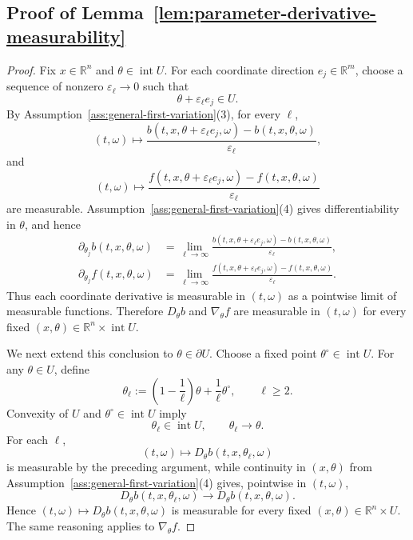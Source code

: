 \documentclass[11pt]{amsart}
\numberwithin{equation}{section} %
\theoremstyle{remark}
\begin{document}
\subsection{Proof of Lemma~\ref{lem:parameter-derivative-measurability}}
\label{app:regularity-parameter-derivatives}

\begin{proof}
Fix $x\in\mathbb R^n$ and
$\theta\in\operatorname{int}U$.
For each coordinate direction $e_j\in\mathbb R^m$, choose a sequence
of nonzero $\varepsilon_\ell\to0$ such that
\[
\theta+\varepsilon_\ell e_j\in U.
\]
By Assumption~\ref{ass:general-first-variation}(3), for every $\ell$,
\[
(t,\omega)
\longmapsto
\frac{b(t,x,\theta+\varepsilon_\ell e_j,\omega)-b(t,x,\theta,\omega)}{\varepsilon_\ell},
\]
and
\[
(t,\omega)
\longmapsto
\frac{f(t,x,\theta+\varepsilon_\ell e_j,\omega)-f(t,x,\theta,\omega)}{\varepsilon_\ell}
\]
are measurable. Assumption~\ref{ass:general-first-variation}(4)
gives differentiability in $\theta$, and hence
\[
\begin{aligned}
\partial_{\theta_j}b(t,x,\theta,\omega)
&=\lim_{\ell\to\infty}
\frac{b(t,x,\theta+\varepsilon_\ell e_j,\omega)-b(t,x,\theta,\omega)}{\varepsilon_\ell},\\
\partial_{\theta_j}f(t,x,\theta,\omega)
&=\lim_{\ell\to\infty}
\frac{f(t,x,\theta+\varepsilon_\ell e_j,\omega)-f(t,x,\theta,\omega)}{\varepsilon_\ell}.
\end{aligned}
\]
Thus each coordinate derivative is measurable in $(t,\omega)$ as a
pointwise limit of measurable functions. Therefore $D_\theta b$ and
$\nabla_\theta f$ are measurable in $(t,\omega)$ for every fixed
$(x,\theta)\in\mathbb R^n\times\operatorname{int}U$.

We next extend this conclusion to $\theta\in\partial U$. Choose a fixed point $\theta^\circ\in\operatorname{int}U$.
For any $\theta\in U$, define
\[
\theta_\ell
:=
\left(1-\frac1\ell\right)\theta
+
\frac1\ell\theta^\circ,
\qquad \ell\ge2.
\]
Convexity of $U$ and
$\theta^\circ\in\operatorname{int}U$ imply
\[
\theta_\ell\in\operatorname{int}U,
\qquad
\theta_\ell\longrightarrow\theta.
\]
For each $\ell$,
\[
(t,\omega)
\longmapsto
D_\theta b(t,x,\theta_\ell,\omega)
\]
is measurable by the preceding argument, while continuity in
$(x,\theta)$ from
Assumption~\ref{ass:general-first-variation}(4) gives, pointwise in
$(t,\omega)$,
\[
D_\theta b(t,x,\theta_\ell,\omega)
\longrightarrow
D_\theta b(t,x,\theta,\omega).
\]
Hence
$(t,\omega)\mapsto D_\theta b(t,x,\theta,\omega)$
is measurable for every fixed $(x,\theta)\in\mathbb R^n\times U$.
The same reasoning applies to $\nabla_\theta f$.


\end{proof}
\end{document}
